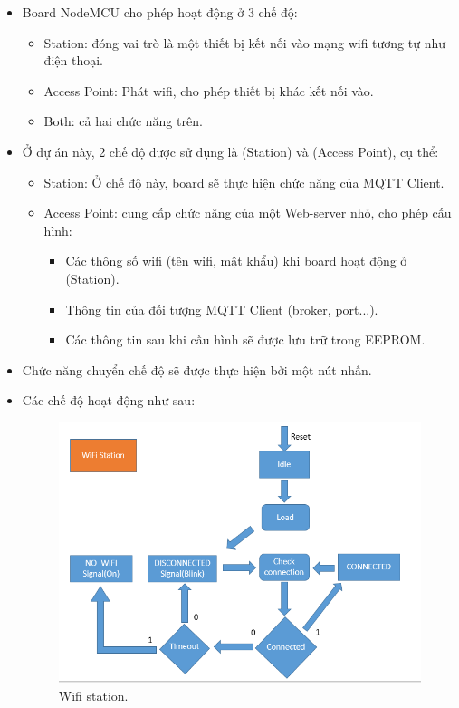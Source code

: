 \documentclass[a4paper,12pt,oneside]{article}
\begin{document}
	\begin{itemize}
	\item	Board NodeMCU cho phép hoạt động ở 3 chế độ:
		\begin{itemize}
		\item	Station: đóng vai trò là một thiết bị kết nối vào mạng wifi tương tự như điện thoại.
		\item	Access Point: Phát wifi, cho phép thiết bị khác kết nối vào.
		\item	Both: cả hai chức năng trên.
		\end{itemize}

	\item	Ở dự án này, 2 chế độ được sử dụng là (Station) và (Access Point), cụ thể:
		\begin{itemize}
		\item	Station: Ở chế độ này, board sẽ thực hiện chức năng của MQTT Client.
		\item	Access Point: cung cấp chức năng của một Web-server nhỏ, cho phép cấu hình:
			\begin{itemize}
				\item	Các thông  số wifi (tên wifi, mật khẩu) khi board hoạt động ở (Station). 
				\item	Thông tin của đối tượng MQTT Client (broker, port...).
				\item	Các thông tin sau khi cấu hình sẽ được lưu trữ trong EEPROM.
			\end{itemize}
		\end{itemize}


	\item	Chức năng chuyển chế độ sẽ được thực hiện bởi một nút nhấn.
	\item	Các chế độ hoạt động như sau:
	
			\begin{center}
			\begin{figure}[h!]
			\begin{center}
			\includegraphics[scale=.6]{hinh/wifi_station.PNG}
			\end{center}
			\caption{Wifi station.}
			\end{figure}
			\end{center}
			

\end{itemize}
\end{document}
